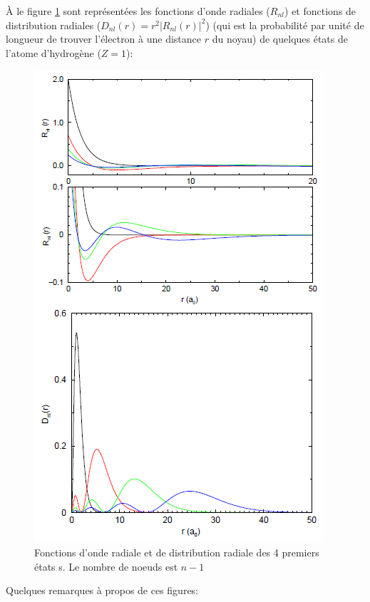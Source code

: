 À le figure \ref{fig:fcx_rad_1} sont représentées les fonctions d'onde radiales ($R_{nl}$) et fonctions de distribution radiales ($D_{nl}(r)=r^2|R_{nl}(r)|^2$) (qui est la probabilité par unité de longueur de trouver l'électron à une distance $r$ du noyau) de quelques états de l'atome d'hydrogène ($Z=1$):
\begin{figure}[htp]
    \centering
    \includegraphics[scale=0.8]{Images2/ex.PNG}
    \caption{Fonctions d'onde radiale et de distribution radiale des 4 premiers états s. Le nombre de noeuds est $n-1$}
    \label{fig:fcx_rad_1}
\end{figure}
Quelques remarques à propos de ces figures:


